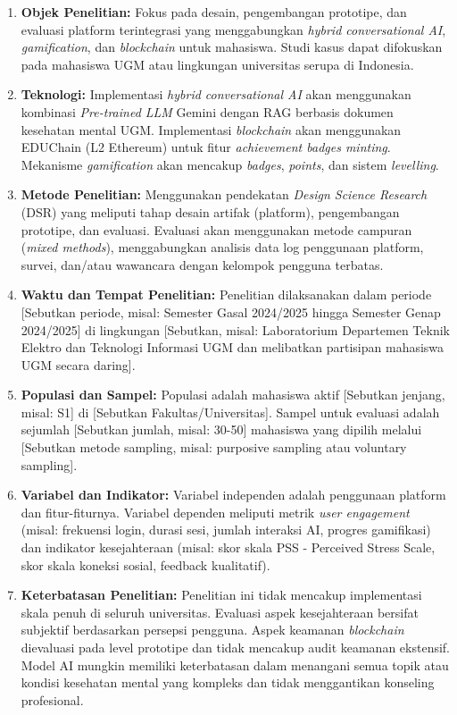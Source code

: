 \begin{enumerate}
    \item \textbf{Objek Penelitian:} Fokus pada desain, pengembangan prototipe, dan evaluasi platform terintegrasi yang menggabungkan \textit{hybrid conversational AI}, \textit{gamification}, dan \textit{blockchain} untuk mahasiswa. Studi kasus dapat difokuskan pada mahasiswa UGM atau lingkungan universitas serupa di Indonesia.
    \item \textbf{Teknologi:} Implementasi \textit{hybrid conversational AI} akan menggunakan kombinasi \textit{Pre-trained LLM} Gemini dengan RAG berbasis dokumen kesehatan mental UGM. Implementasi \textit{blockchain} akan menggunakan EDUChain (L2 Ethereum) untuk fitur \textit{achievement badges minting}. Mekanisme \textit{gamification} akan mencakup \textit{badges}, \textit{points}, dan sistem \textit{levelling}.
    \item \textbf{Metode Penelitian:} Menggunakan pendekatan \textit{Design Science Research} (DSR) yang meliputi tahap desain artifak (platform), pengembangan prototipe, dan evaluasi. Evaluasi akan menggunakan metode campuran (\textit{mixed methods}), menggabungkan analisis data log penggunaan platform, survei, dan/atau wawancara dengan kelompok pengguna terbatas.
    \item \textbf{Waktu dan Tempat Penelitian:} Penelitian dilaksanakan dalam periode [Sebutkan periode, misal: Semester Gasal 2024/2025 hingga Semester Genap 2024/2025] di lingkungan [Sebutkan, misal: Laboratorium Departemen Teknik Elektro dan Teknologi Informasi UGM dan melibatkan partisipan mahasiswa UGM secara daring].
    \item \textbf{Populasi dan Sampel:} Populasi adalah mahasiswa aktif [Sebutkan jenjang, misal: S1] di [Sebutkan Fakultas/Universitas]. Sampel untuk evaluasi adalah sejumlah [Sebutkan jumlah, misal: 30-50] mahasiswa yang dipilih melalui [Sebutkan metode sampling, misal: purposive sampling atau voluntary sampling].
    \item \textbf{Variabel dan Indikator:} Variabel independen adalah penggunaan platform dan fitur-fiturnya. Variabel dependen meliputi metrik \textit{user engagement} (misal: frekuensi login, durasi sesi, jumlah interaksi AI, progres gamifikasi) dan indikator kesejahteraan (misal: skor skala PSS - Perceived Stress Scale, skor skala koneksi sosial, feedback kualitatif).
    \item \textbf{Keterbatasan Penelitian:} Penelitian ini tidak mencakup implementasi skala penuh di seluruh universitas. Evaluasi aspek kesejahteraan bersifat subjektif berdasarkan persepsi pengguna. Aspek keamanan \textit{blockchain} dievaluasi pada level prototipe dan tidak mencakup audit keamanan ekstensif. Model AI mungkin memiliki keterbatasan dalam menangani semua topik atau kondisi kesehatan mental yang kompleks dan tidak menggantikan konseling profesional.
\end{enumerate}

